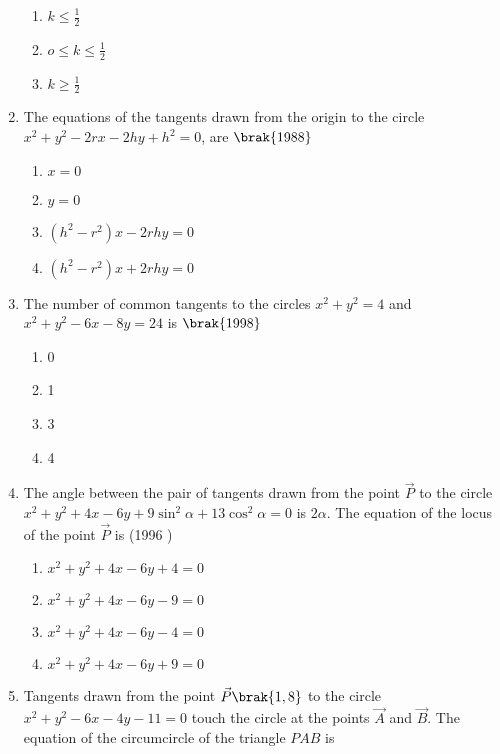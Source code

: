 \begin{enumerate}
\begin{multicols}{4}
\begin{enumerate}
\item $k \le \frac{1}{2}$
\item $o \le k \le \frac{1}{2}$
\item $k \ge \frac{1}{2}$
\end{enumerate}
\end{multicols}
\item The equations of the tangents drawn from the origin to the circle $x^2+y^2-2rx-2hy+h^2=0$, are
    \hfill$\brak{1988}$
\begin{multicols}{2}
\begin{enumerate}
    \item $x=0$
    \item $y=0$
    \item $(h^2-r^2)x-2rhy=0$
    \item $(h^2-r^2)x+2rhy=0$
\end{enumerate}
\end{multicols}
\item The number of common tangents to the circles $x^2+y^2=4$ and $x^2+y^2-6x-8y=24$ is 
    \hfill$\brak{1998}$
\begin{multicols}{4}
\begin{enumerate}
    \item 0
    \item 1 
    \item 3
    \item 4
\end{enumerate}
\end{multicols}
    \item The angle between the pair of tangents drawn from the point $\vec{P}$ to the circle $x^{2}+y^{2}+4x-6y+9\sin^{2}{\alpha}+13\cos^{2}{\alpha}=0$ is $2\alpha$. The equation of the locus of the point $\vec{P}$ is
    \hfill {(1996 )}
\begin{multicols}{2}
\begin{enumerate}
    	\item $x^{2}+y^{2}+4x-6y+4=0$
    	\item $x^{2}+y^{2}+4x-6y-9=0$
    	\item $x^{2}+y^{2}+4x-6y-4=0$
    	\item $x^{2}+y^{2}+4x-6y+9=0$
    \end{enumerate}
\end{multicols}
         \item Tangents drawn from the point $\vec{P}\brak{1, 8}$ to the circle $x^2+y^2-6x-4y-11=0$ touch the circle at the points $\vec{A}$ and $\vec{B}$. The equation of the circumcircle of the triangle $PAB$ is

\end{enumerate}
